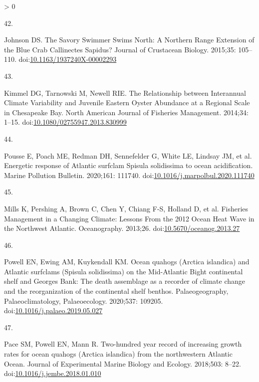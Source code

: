 \documentclass[
  10pt,
]{article}
\newlength{\cslhangindent}
\newlength{\csllabelwidth}
\newenvironment{CSLReferences}[2] %
 {%
  \setlength{\parindent}{0pt}
  \ifodd #1 \everypar{\setlength{\hangindent}{\cslhangindent}}\ignorespaces\fi
  \ifnum #2 > 0
  \setlength{\parskip}{#2\baselineskip}
  \fi
 }%
 {}
\newcommand{\CSLLeftMargin}[1]{\parbox[t]{\csllabelwidth}{#1}}
\newcommand{\CSLRightInline}[1]{\parbox[t]{\linewidth - \csllabelwidth}{#1}\break}
\begin{document}
\begin{CSLReferences}{0}{0}
\leavevmode\hypertarget{ref-johnson_savory_2015}{}%
\CSLLeftMargin{42. }
\CSLRightInline{Johnson DS. The {Savory} {Swimmer} {Swims} {North}: {A}
{Northern} {Range} {Extension} of the {Blue} {Crab} {Callinectes}
{Sapidus}? Journal of Crustacean Biology. 2015;35: 105--110.
doi:\href{https://doi.org/10.1163/1937240X-00002293}{10.1163/1937240X-00002293}}

\leavevmode\hypertarget{ref-kimmel_relationship_2014}{}%
\CSLLeftMargin{43. }
\CSLRightInline{Kimmel DG, Tarnowski M, Newell RIE. The {Relationship}
between {Interannual} {Climate} {Variability} and {Juvenile} {Eastern}
{Oyster} {Abundance} at a {Regional} {Scale} in {Chesapeake} {Bay}.
North American Journal of Fisheries Management. 2014;34: 1--15.
doi:\href{https://doi.org/10.1080/02755947.2013.830999}{10.1080/02755947.2013.830999}}

\leavevmode\hypertarget{ref-pousse_energetic_2020}{}%
\CSLLeftMargin{44. }
\CSLRightInline{Pousse E, Poach ME, Redman DH, Sennefelder G, White LE,
Lindsay JM, et al. Energetic response of {Atlantic} surfclam {Spisula}
solidissima to ocean acidification. Marine Pollution Bulletin. 2020;161:
111740.
doi:\href{https://doi.org/10.1016/j.marpolbul.2020.111740}{10.1016/j.marpolbul.2020.111740}}

\leavevmode\hypertarget{ref-mills_fisheries_2013}{}%
\CSLLeftMargin{45. }
\CSLRightInline{Mills K, Pershing A, Brown C, Chen Y, Chiang F-S,
Holland D, et al. Fisheries {Management} in a {Changing} {Climate}:
{Lessons} {From} the 2012 {Ocean} {Heat} {Wave} in the {Northwest}
{Atlantic}. Oceanography. 2013;26.
doi:\href{https://doi.org/10.5670/oceanog.2013.27}{10.5670/oceanog.2013.27}}

\leavevmode\hypertarget{ref-powell_ocean_2020}{}%
\CSLLeftMargin{46. }
\CSLRightInline{Powell EN, Ewing AM, Kuykendall KM. Ocean quahogs
({Arctica} islandica) and {Atlantic} surfclams ({Spisula} solidissima)
on the {Mid}-{Atlantic} {Bight} continental shelf and {Georges} {Bank}:
{The} death assemblage as a recorder of climate change and the
reorganization of the continental shelf benthos. Palaeogeography,
Palaeoclimatology, Palaeoecology. 2020;537: 109205.
doi:\href{https://doi.org/10.1016/j.palaeo.2019.05.027}{10.1016/j.palaeo.2019.05.027}}

\leavevmode\hypertarget{ref-pace_two-hundred_2018}{}%
\CSLLeftMargin{47. }
\CSLRightInline{Pace SM, Powell EN, Mann R. Two-hundred year record of
increasing growth rates for ocean quahogs ({Arctica} islandica) from the
northwestern {Atlantic} {Ocean}. Journal of Experimental Marine Biology
and Ecology. 2018;503: 8--22.
doi:\href{https://doi.org/10.1016/j.jembe.2018.01.010}{10.1016/j.jembe.2018.01.010}}


\end{CSLReferences}
\end{document}
